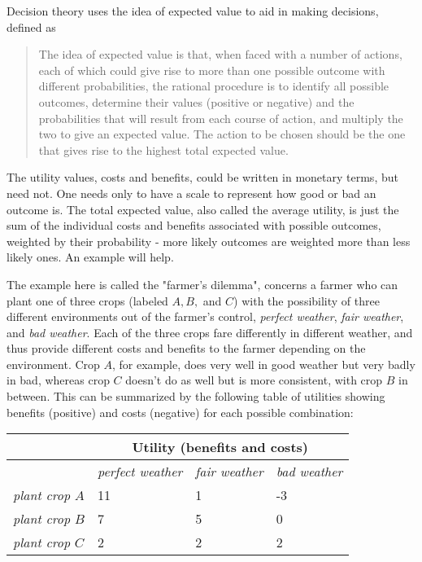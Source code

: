 Decision theory uses the idea of expected value to aid in making decisions, defined as\cite{Wikipedia:2015aa}
\begin{quote}
The idea of expected value is that, when faced with a number of actions, each of which could give rise to more than one possible outcome with different probabilities, the rational procedure is to identify all
possible outcomes, determine their values (positive or negative) and the
probabilities that will result from each course of action, and multiply
the two to give an expected value. The action to be chosen should be the
one that gives rise to the highest total expected value.
\end{quote}

The utility values, costs and benefits, could be written in monetary terms, but need not.  One needs only to have a scale to represent how good or bad an outcome is.  The total expected value, also called the  average utility, is just the sum of the individual costs and benefits associated with possible outcomes, weighted by their probability - more likely outcomes are weighted more than less likely ones.  An example will help.

The example here is called the "farmer's dilemma"\cite{jordaan2005decisions}, concerns a farmer who can plant one of three crops (labeled $A, B, $ and $C$) with the possibility of three different environments out of the farmer's control, {\em perfect weather}, {\em fair weather}, and {\em bad weather}.  Each of the three crops fare differently in different weather, and thus provide different costs and benefits to the farmer depending on the environment.  Crop $A$, for example, does very well in good weather but very badly in bad, whereas crop $C$ doesn't do as well but is more consistent, with crop $B$ in between.  This can be summarized by the following table of utilities showing benefits (positive) and costs (negative) for each possible combination:

\begin{tabular}{@{}llll@{}}
\toprule
 & \multicolumn{3}{c}{\textbf{Utility (benefits and costs)}}   \\ \midrule
 & \textit{perfect weather} & \textit{fair weather} & \textit{bad weather}   \\
\textit{plant crop $A$} & 11 & 1 & -3  \\
\textit{plant crop $B$} & 7 & 5 & 0  \\
\textit{plant crop $C$} & 2 & 2 & 2   \\ \bottomrule
\end{tabular}
\vspace{.1in}

